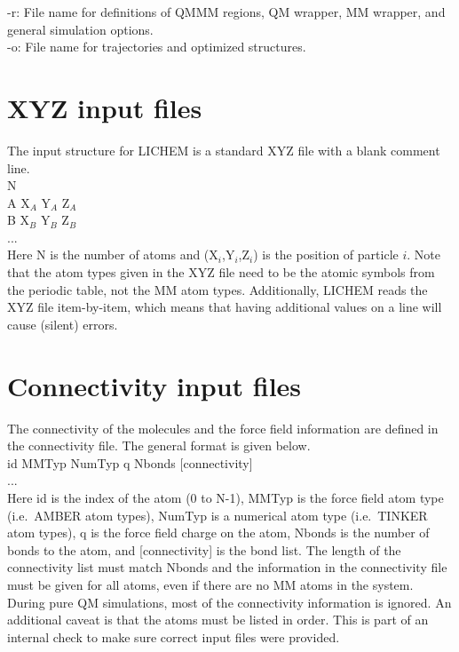 \documentclass[12pt]{report}
\begin{document}
-r: File name for definitions of QMMM regions, QM wrapper, MM wrapper,
and general simulation options. \\

-o: File name for trajectories and optimized structures.

\section{XYZ input files}

The input structure for LICHEM is a standard XYZ file with a blank comment
line. \\

N \\

A  X$_A$  Y$_A$  Z$_A$ \\
B  X$_B$  Y$_B$  Z$_B$ \\
... \\

Here N is the number of atoms and (X$_i$,Y$_i$,Z$_i$) is the position of
particle $i$.
Note that the atom types given in the XYZ file need to be the atomic symbols
from the periodic table, not the MM atom types.
Additionally, LICHEM reads the XYZ file item-by-item, which means that having
additional values on a line will cause (silent) errors.

\section{Connectivity input files}

The connectivity of the molecules and the force field information are defined
in the connectivity file.
The general format is given below. \\

id MMTyp NumTyp q Nbonds [connectivity] \\
... \\

Here id is the index of the atom (0 to N-1), MMTyp is the force field atom
type (i.e.\ AMBER atom types), NumTyp is a numerical atom type (i.e.\ TINKER
atom types), q is the force field charge on the atom, Nbonds is the number of
bonds to the atom, and [connectivity] is the bond list.
The length of the connectivity list must match Nbonds and the information in
the connectivity file must be given for all atoms, even if there are no MM
atoms in the system.
During pure QM simulations, most of the connectivity information is ignored.
An additional caveat is that the atoms must be listed in order.
This is part of an internal check to make sure correct input files were
provided.
\end{document}
